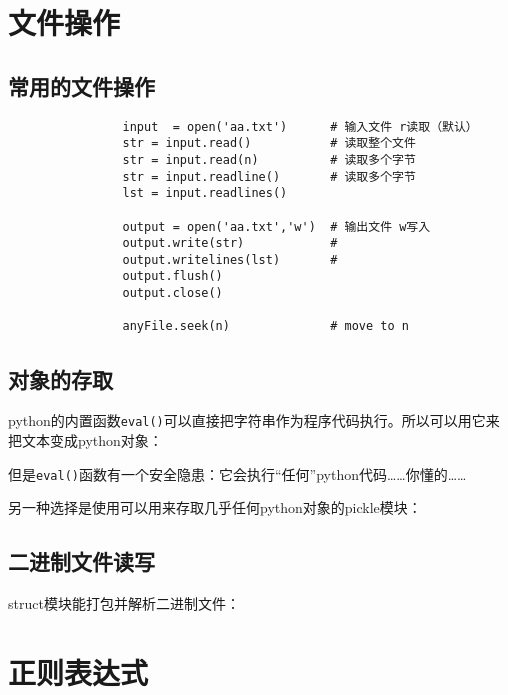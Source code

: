 	\section{文件操作}
		
		\subsection{常用的文件操作}

			\begin{verbatim}
				input  = open('aa.txt')      # 输入文件 r读取（默认）
				str = input.read()           # 读取整个文件
				str = input.read(n)          # 读取多个字节
				str = input.readline()       # 读取多个字节
				lst = input.readlines()

				output = open('aa.txt','w')  # 输出文件 w写入
				output.write(str)            #
				output.writelines(lst)       #
				output.flush()
				output.close()

				anyFile.seek(n)              # move to n
			\end{verbatim}

		\subsection{对象的存取}

			python的内置函数\verb|eval()|可以直接把字符串作为程序代码执行。所以可以用它来把文本变成python对象：

			

			但是\verb|eval()|函数有一个安全隐患：它会执行“任何”python代码……你懂的……

			另一种选择是使用可以用来存取几乎任何python对象的pickle模块：

			

		\subsection{二进制文件读写}
			
			struct模块能打包并解析二进制文件：

			

	\section{正则表达式}
		
		
